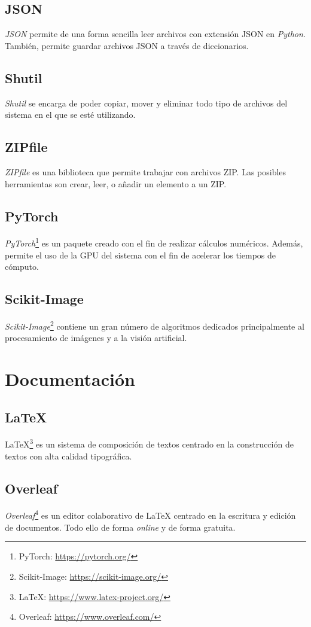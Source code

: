 \subsection{JSON}
\emph{JSON} permite de una forma sencilla leer archivos con extensión JSON en \emph{Python}. También, permite guardar archivos JSON a través de diccionarios.

\subsection{Shutil}
\emph{Shutil} se encarga de poder copiar, mover y eliminar todo tipo de archivos del sistema en el que se esté utilizando.

\subsection{ZIPfile}
\emph{ZIPfile} es una biblioteca que permite trabajar con archivos ZIP. Las posibles herramientas son crear, leer, o añadir un elemento a un ZIP.

\subsection{PyTorch}
\emph{PyTorch}\footnote{PyTorch: \url{https://pytorch.org/}} es un paquete creado con el fin de realizar cálculos numéricos. Además, permite el uso de la GPU del sistema con el fin de acelerar los tiempos de cómputo.

\subsection{Scikit-Image}
\emph{Scikit-Image}\footnote{Scikit-Image: \url{https://scikit-image.org/}} contiene un gran número de algoritmos dedicados principalmente al procesamiento de imágenes y a la visión artificial.


\section{Documentación}
\subsection{\LaTeX}
\LaTeX\footnote{\LaTeX: \url{https://www.latex-project.org/}} es un sistema de composición de textos centrado en la construcción de textos con alta calidad tipográfica. 

\subsection{Overleaf}
\emph{Overleaf}\footnote{Overleaf: \url{https://www.overleaf.com/}} es un editor colaborativo de \LaTeX{} centrado en la escritura y edición de documentos. Todo ello de forma \emph{online} y de forma gratuita.

